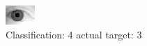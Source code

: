 \begin{figure}[h!]
\begin{center}
\includegraphics[width=0.60\columnwidth]{figures/ID2186_class_4_target_3.png}
\end{center}
\caption{ Classification: 4 actual target: 3}
\label{fig:ID2186_class_4_target_3}
\end{figure}
